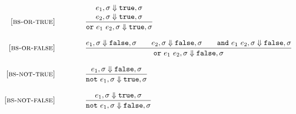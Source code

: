 \documentclass{article}
\begin{document}
\begin{figure}[H]
\[\begin{array}{r@{\qquad\qquad}l}
\bsrule{bs-or-true}{
  \bstep{e_1}{\sigma}{\true}{\sigma} \\
  \bstep{e_2}{\sigma}{\true}{\sigma}
}{
  \bstep{\orE{e_1}{e_2}}{\sigma}{\true}{\sigma}
}

\bsrule{bs-or-false}{
  \bstep{e_1}{\sigma}{\false}{\sigma} \qquad
  \bstep{e_2}{\sigma}{\false}{\sigma} \qquad
  \bstep{\andE{e_1}{e_2}}{\sigma}{\false}{\sigma}
}{
  \bstep{\orE{e_1}{e_2}}{\sigma}{\false}{\sigma}
}

\bsrule{bs-not-true}{
  \bstep{e_1}{\sigma}{\false}{\sigma} 
}{
  \bstep{\notE{e_1}}{\sigma}{\true}{\sigma}
}

\bsrule{bs-not-false}{
  \bstep{e_1}{\sigma}{\true}{\sigma} 
}{
  \bstep{\notE{e_1}}{\sigma}{\false}{\sigma}
}



\end{array}
\]
\end{figure}
\end{document}
